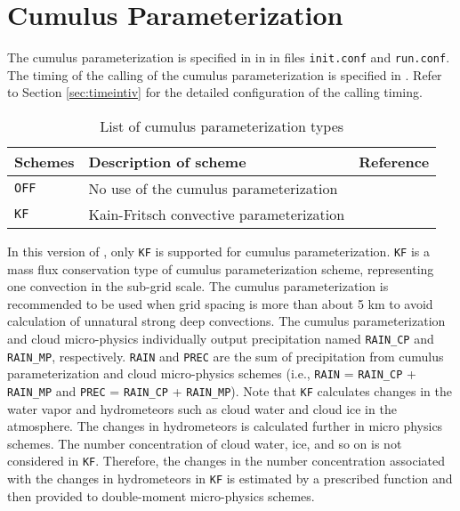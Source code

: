
\section{Cumulus Parameterization} \label{sec:basic_usel_cumulus}

The cumulus parameterization is specified in  in  in files \verb|init.conf| and \verb|run.conf|. The timing of the calling of the cumulus parameterization is specified in . Refer to Section \ref{sec:timeintiv} for the detailed configuration of the calling timing.

\begin{table}[h]
\begin{center}
  \caption{List of cumulus parameterization types}
  \label{tab:nml_atm_cp}
  \begin{tabularx}{150mm}{lXX} \hline
    \rowcolor[gray]{0.9}  Schemes & Description of scheme & Reference\\ \hline
      \verb|OFF|  & No use of the cumulus parameterization &  \\
      \verb|KF|   & Kain-Fritsch convective parameterization & \citet{kain_1990,kain_2004} \\
    \hline
  \end{tabularx}
\end{center}
\end{table}

In this version of \scalerm, only \verb|KF| is supported for cumulus parameterization. \verb|KF| is a mass flux conservation type of cumulus parameterization scheme, representing one convection in the sub-grid scale.
The cumulus parameterization is recommended to be used when grid spacing is more than about 5 km to avoid calculation of unnatural strong deep convections.
The cumulus parameterization and cloud micro-physics individually output
precipitation named \verb|RAIN_CP| and \verb|RAIN_MP|, respectively.
\verb|RAIN| and \verb|PREC| are the sum of precipitation
from cumulus parameterization and cloud micro-physics schemes
(i.e., \verb|RAIN| = \verb|RAIN_CP| + \verb|RAIN_MP|
and \verb|PREC| = \verb|RAIN_CP| + \verb|RAIN_MP|).
Note that \verb|KF| calculates changes in the water vapor and
hydrometeors such as cloud water and cloud ice in the atmosphere.
The changes in hydrometeors is calculated further in micro physics schemes.
The number concentration of cloud water, ice, and so on
is not considered in \verb|KF|.
Therefore,
the changes in the number concentration
associated with the changes in hydrometeors in \verb|KF|
is estimated by a prescribed function
and then
provided to double-moment micro-physics schemes.



